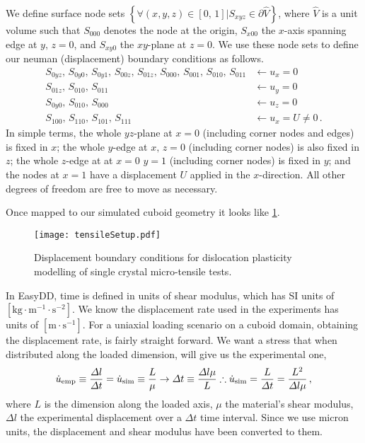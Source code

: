 We define surface node sets $\left\{\forall (x, y, z) \in [0,\, 1] \vert S_{xyz} \in \partial \hat{V}\right\}$, where $\hat{V}$ is a unit volume such that $S_{000}$ denotes the node at the origin, $S_{x00}$ the $x$-axis spanning edge at $y,\, z=0$, and $S_{xy0}$ the $xy$-plane at $z=0$. We use these node sets to define our neuman (displacement) boundary conditions as follows.
\begin{subequations}
    \begin{align}
        S_{0yz},\, S_{0y0},\, S_{0y1},\, S_{00z},\, S_{01z},\, S_{000},\, S_{001},\, S_{010},\, S_{011} & \gets u_x = 0           \\
        S_{01z},\, S_{010},\, S_{011}                                                                   & \gets u_y = 0           \\
        S_{0y0},\, S_{010},\, S_{000}                                                                   & \gets u_z = 0           \\
        S_{100},\, S_{110},\, S_{101},\, S_{111}                                                        & \gets u_x = U \neq 0\,.
    \end{align}
\end{subequations}
In simple terms, the whole $yz$-plane at $x=0$ (including corner nodes and edges) is fixed in $x$; the whole $y$-edge at $x,\,z=0$ (including corner nodes) is also fixed in $z$; the whole $z$-edge at at $x = 0\,\, y = 1$ (including corner nodes) is fixed in $y$; and the nodes at $x=1$ have a displacement $U$ applied in the $x$-direction. All other degrees of freedom are free to move as necessary.

Once mapped to our simulated cuboid geometry it looks like \cref{f:tensileSetup}.
\begin{figure}
    \centering
    \texttt{[image: tensileSetup.pdf]}
    \caption[Displacement boundary conditions for dislocation plasticity modelling of single crystal micro-tensile tests.]{Displacement boundary conditions for dislocation plasticity modelling of single crystal micro-tensile tests.}
    \label{f:tensileSetup}
\end{figure}

In EasyDD, time is defined in units of shear modulus, which has SI units of $\left[\si{\kilo\gram\cdot\metre^{-1}\cdot\second^{-2}}\right]$. We know the displacement rate used in the experiments has units of $\left[\si{\metre\cdot\second^{-1}}\right]$. For a uniaxial loading scenario on a cuboid domain, obtaining the displacement rate, is fairly straight forward. We want a stress that when distributed along the loaded dimension, will give us the experimental one,
\begin{align}
    \dot{u}_{\textrm{emp}} \equiv \dfrac{\Delta l}{\Delta t} =
    \dot{u}_{\textrm{sim}} \equiv \dfrac{L}{\mu} \to
    \Delta t \equiv \dfrac{\Delta l \mu}{L} \therefore
    \dot{u}_{\textrm{sim}} = \dfrac{L}{\Delta t} = \dfrac{L^2}{\Delta l \mu}\,,
\end{align}
where $L$ is the dimension along the loaded axis, $\mu$ the material's shear modulus, $\Delta l$ the experimental displacement over a $\Delta t$ time interval. Since we use micron units, the displacement and shear modulus have been converted to them.

